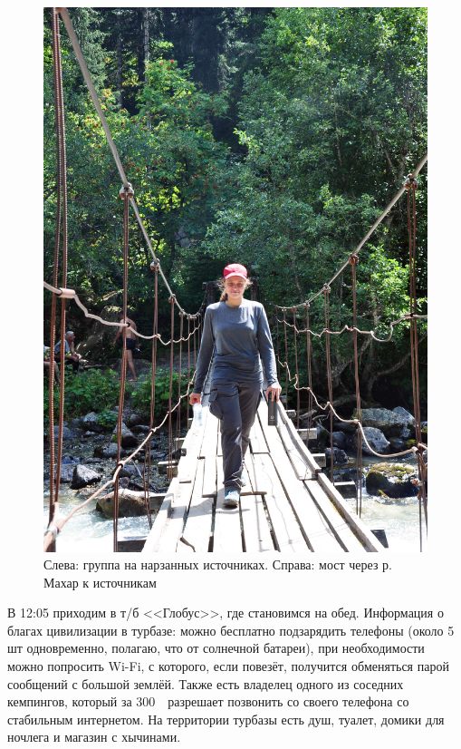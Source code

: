 \begin{figure}[h!]
\begin{minipage}[h]{0.35\linewidth}
		\includegraphics[width=\linewidth]{../pics/DSC_1098.jpg}
	\end{minipage}
	\caption{Слева: группа на нарзанных источниках. Справа: мост через р. Махар к источникам}
	\label{fig:DSC_1043}
\end{figure}

В 12:05 приходим в т/б <<Глобус>>, где становимся на обед. Информация о благах цивилизации в турбазе: можно бесплатно подзарядить телефоны (около 5 шт одновременно, полагаю, что от солнечной батареи), при необходимости можно попросить Wi-Fi, с которого, если повезёт, получится обменяться парой сообщений с большой землёй. Также есть владелец одного из соседних кемпингов, который за 300~\faRub~разрешает позвонить со своего телефона со стабильным интернетом. На территории турбазы есть душ, туалет, домики для ночлега и магазин с хычинами.

